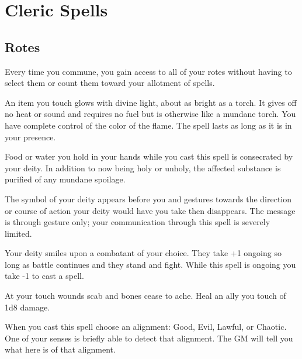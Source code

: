 \section*{Cleric Spells}
\subsection{Rotes} 


 Every time you commune, you gain access to all of your rotes without having to select them or count them toward your allotment of spells.




 An item you touch glows with divine light, about as bright as a torch. It gives off no heat or sound and requires no fuel but is otherwise like a mundane torch. You have complete control of the color of the flame. The spell lasts as long as it is in your presence.




 Food or water you hold in your hands while you cast this spell is consecrated by your deity. In addition to now being holy or unholy, the affected substance is purified of any mundane spoilage.




 The symbol of your deity appears before you and gestures towards the direction or course of action your deity would have you take then disappears. The message is through gesture only; your communication through this spell is severely limited.





 Your deity smiles upon a combatant of your choice. They take +1 ongoing so long as battle continues and they stand and fight. While this spell is ongoing you take -1 to cast a spell.




 At your touch wounds scab and bones cease to ache. Heal an ally you touch of 1d8 damage.




 When you cast this spell choose an alignment: Good, Evil, Lawful, or Chaotic. One of your senses is briefly able to detect that alignment. The GM will tell you what here is of that alignment.

\newpage
{}



